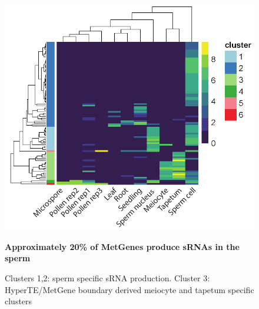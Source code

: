 \begin{figure}[htbp!] 
\centering    
    \includegraphics[width=1\textwidth]{Chapter2/Figs/Figure11_Reactivated_MetGenes_heatmap.pdf}
\caption{\textbf{Approximately 20\% of MetGenes produce sRNAs in the sperm}}
\label{fig:hm_metgene_reactivated}
\captionsetup{font=small}
    \caption*{Clusters 1,2: sperm specific sRNA production. Cluster 3: HyperTE/MetGene boundary derived meiocyte and tapetum specific clusters}
\end{figure}

